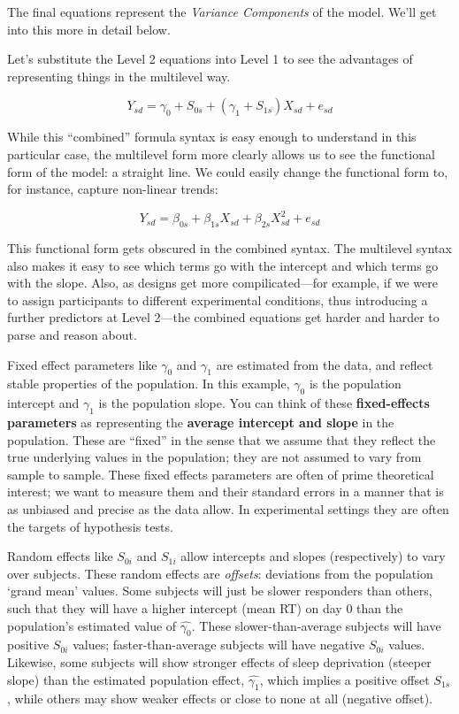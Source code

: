 \documentclass[]{book}
\begin{document}
The final equations represent the \emph{Variance Components} of the model. We'll get into this more in detail below.

Let's substitute the Level 2 equations into Level 1 to see the advantages of representing things in the multilevel way.

\begin{equation}
Y_{sd} = \gamma_{0} + S_{0s} + \left(\gamma_{1} + S_{1s}\right) X_{sd} + e_{sd}
\end{equation}

While this ``combined'' formula syntax is easy enough to understand in this particular case, the multilevel form more clearly allows us to see the functional form of the model: a straight line. We could easily change the functional form to, for instance, capture non-linear trends:

\[Y_{sd} = \beta_{0s} + \beta_{1s} X_{sd} + \beta_{2s} X_{sd}^2 + e_{sd}\]

This functional form gets obscured in the combined syntax. The multilevel syntax also makes it easy to see which terms go with the intercept and which terms go with the slope. Also, as designs get more compilicated---for example, if we were to assign participants to different experimental conditions, thus introducing a further predictors at Level 2---the combined equations get harder and harder to parse and reason about.

Fixed effect parameters like \(\gamma_0\) and \(\gamma_1\) are estimated from the data, and reflect stable properties of the population. In this example, \(\gamma_0\) is the population intercept and \(\gamma_1\) is the population slope. You can think of these \textbf{fixed-effects parameters} as representing the \textbf{average intercept and slope} in the population. These are ``fixed'' in the sense that we assume that they reflect the true underlying values in the population; they are not assumed to vary from sample to sample. These fixed effects parameters are often of prime theoretical interest; we want to measure them and their standard errors in a manner that is as unbiased and precise as the data allow. In experimental settings they are often the targets of hypothesis tests.

Random effects like \(S_{0i}\) and \(S_{1i}\) allow intercepts and slopes (respectively) to vary over subjects. These random effects are \emph{offsets}: deviations from the population `grand mean' values. Some subjects will just be slower responders than others, such that they will have a higher intercept (mean RT) on day 0 than the population's estimated value of \(\hat{\gamma_0}\). These slower-than-average subjects will have positive \(S_{0i}\) values; faster-than-average subjects will have negative \(S_{0i}\) values. Likewise, some subjects will show stronger effects of sleep deprivation (steeper slope) than the estimated population effect, \(\hat{\gamma_1}\), which implies a positive offset \(S_{1s}\), while others may show weaker effects or close to none at all (negative offset).
\end{document}
